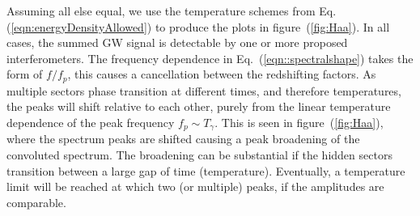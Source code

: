 \documentclass[nofootinbib,twocolumn,preprintnumbers]{revtex4-1}
\begin{document}
Assuming all else equal, we use the temperature schemes from Eq. (\ref{eqn:energyDensityAllowed}) to produce the plots in figure~(\ref{fig:Haa}). In all cases, the summed GW signal is detectable by one or more proposed interferometers. The frequency dependence in Eq.~(\ref{eqn::spectralshape}) takes the form of $f/f_{p}$, this causes a cancellation between the redshifting factors. As multiple sectors phase transition at different times, and therefore temperatures, the peaks will shift relative to each other, purely from the linear temperature dependence of the peak frequency $f_{p} \sim T_{\gamma}$.  This is seen in figure~(\ref{fig:Haa}), where the spectrum peaks are shifted causing a peak broadening of the convoluted spectrum. The broadening can be substantial if the hidden sectors transition between a large gap of time (temperature). Eventually, a temperature limit will be reached at which two (or multiple) peaks, if the amplitudes are comparable. 
\end{document}
